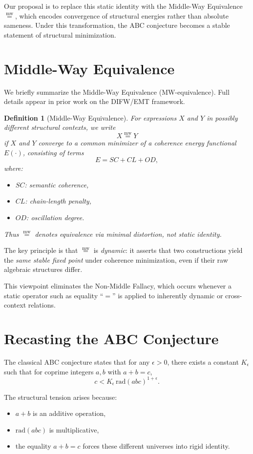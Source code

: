 \documentclass[11pt]{article}
\newcommand{\mweq}{\mathrel{\overset{\mathrm{mw}}{=}}}
\newtheorem{definition}[theorem]{Definition}
\begin{document}
Our proposal is to replace this static identity with the Middle-Way
Equivalence $\mweq$, which encodes convergence of structural energies
rather than absolute sameness.  Under this transformation, the ABC
conjecture becomes a stable statement of structural minimization.

\section{Middle-Way Equivalence}

We briefly summarize the Middle-Way Equivalence (MW-equivalence).
Full details appear in prior work on the DIFW/EMT framework.

\begin{definition}[Middle-Way Equivalence]
For expressions $X$ and $Y$ in possibly different structural contexts,
we write
\[
X \mweq Y
\]
if $X$ and $Y$ converge to a common minimizer of a coherence energy
functional $E(\cdot)$, consisting of terms
\[
E = SC + CL + OD,
\]
where:
\begin{itemize}
\item $SC$: semantic coherence,
\item $CL$: chain-length penalty,
\item $OD$: oscillation degree.
\end{itemize}
Thus $\mweq$ denotes equivalence via minimal distortion, not static identity.
\end{definition}

The key principle is that $\mweq$ is \emph{dynamic}: it asserts that
two constructions yield the \emph{same stable fixed point} under coherence
minimization, even if their raw algebraic structures differ.

This viewpoint eliminates the Non-Middle Fallacy, which occurs whenever
a static operator such as equality ``$=$'' is applied to inherently
dynamic or cross-context relations.

\section{Recasting the ABC Conjecture}

The classical ABC conjecture states that for any $\epsilon > 0$,
there exists a constant $K_{\epsilon}$ such that for coprime integers
$a,b$ with $a+b=c$,
\[
c < K_{\epsilon} \, \mathrm{rad}(abc)^{1+\epsilon}.
\]

The structural tension arises because:
\begin{itemize}
\item $a+b$ is an additive operation,
\item $\mathrm{rad}(abc)$ is multiplicative,
\item the equality $a+b=c$ forces these different universes into rigid
  identity.
\end{itemize}
\end{document}
